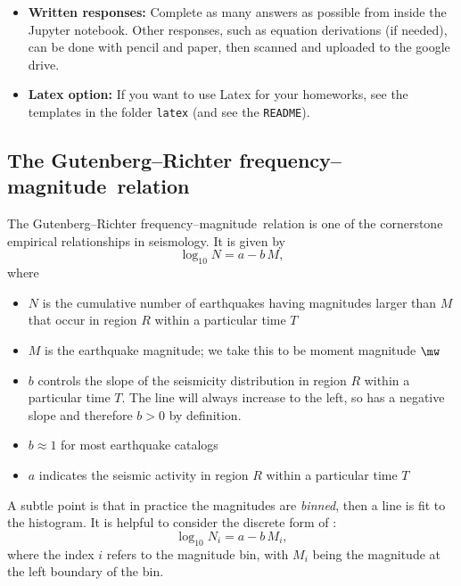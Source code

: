 \documentclass[11pt,titlepage,fleqn]{article}
\newcommand{\fmag}{frequency--magnitude}
\begin{document}
\begin{itemize}
\item {\bf Written responses:}
Complete as many answers as possible from inside the Jupyter notebook. Other responses, such as equation derivations (if needed), can be done with pencil and paper, then scanned and uploaded to the google drive.

\item {\bf Latex option:}
If you want to use Latex for your homeworks, see the templates in the folder \verb+latex+ (and see the \verb+README+).

\end{itemize}


\pagebreak
\subsection*{The Gutenberg--Richter \fmag\ relation}

The Gutenberg--Richter \fmag\ relation \citep{GutenbergRichter1944} is one of the cornerstone empirical relationships in seismology. It is given by
%
\begin{equation}
\log_{10} N = a - b\,M,
\label{GR}
\end{equation}
%
where
%
\begin{itemize}
\item $N$ is the cumulative number of earthquakes having magnitudes larger than $M$ that occur in region $R$ within a particular time $T$
\item $M$ is the earthquake magnitude; we take this to be moment magnitude $\mw$
\item $b$ controls the slope of the seismicity distribution in region $R$ within a particular time $T$. The line will always increase to the left, so  has a negative slope and therefore $b > 0$ by definition.
\item $b \approx 1$ for most earthquake catalogs
\item $a$ indicates the seismic activity in region $R$ within a particular time $T$
\end{itemize}
%
A subtle point is that in practice the magnitudes are {\em binned}, then a line is fit to the histogram. It is helpful to consider the discrete form of :
%
\begin{equation}
\log_{10} N_i = a - b\,M_i,
\label{GRd}
\end{equation}
%
where the index $i$ refers to the magnitude bin, with $M_i$ being the magnitude at the left boundary of the bin.
\end{document}
